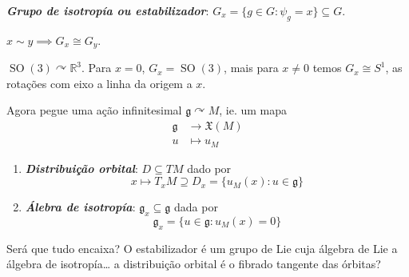\begin{defn} \textit{\textbf{Grupo de isotropía ou estabilizador}}: $G_x=\{g\in G:\psi_g=x\} \subseteq G$.
\end{defn}

\begin{remark}
$x\sim y\implies G_x\cong G_y$.
\end{remark}

\begin{example}
	$\operatorname{SO}(3) \curvearrowright \mathbb{R}^{3}$. Para $x=0$,  $G_x=\operatorname{SO}(3)$, mais para $x \neq 0$ temos $G_x\cong S^1$, as rotações com eixo a linha da origem a $x$.
\end{example}

Agora pegue uma ação infinitesimal $\mathfrak{g} \curvearrowright M$, ie. um mapa
\begin{align*}
	\mathfrak{g} &\longrightarrow \mathfrak{X}(M) \\
	u &\longmapsto u_M
\end{align*}

\begin{defn}\leavevmode
	\begin{enumerate}
		\item \textit{\textbf{Distribuição orbital}}: $D\subseteq TM$ dado por
			\[x\longmapsto T_xM\supseteq D_x=\{u_M(x):u\in\mathfrak{g}\}\]
	
		\item \textit{\textbf{Álebra de isotropía}}: $\mathfrak{g}_{x}\subseteq \mathfrak{g}$ dada por
			\[\mathfrak{g}_x=\{u\in\mathfrak{g} :u_M(x)=0\}\]
	\end{enumerate}
\end{defn}

	Será que tudo encaixa? O estabilizador é um grupo de Lie cuja álgebra de Lie a álgebra de isotropía… a distribuição orbital é o fibrado tangente das órbitas?

